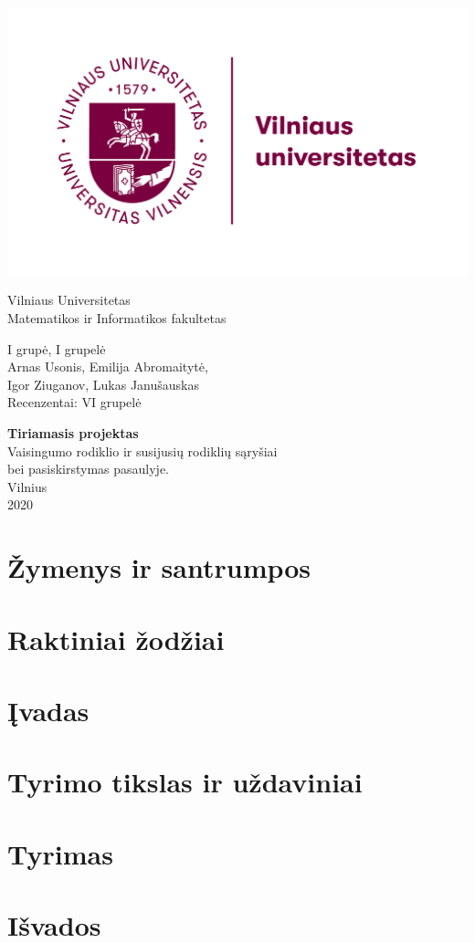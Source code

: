 \documentclass{article}
\begin{document}
\begin{titlepage}
    \centering
    \includegraphics[width=.5\textwidth]{pic/vu_logo.png} \\
    {\Huge
    Vilniaus Universitetas \\
    Matematikos ir Informatikos fakultetas\par} 
    \vspace{2cm}
    
    \Large
    {I grupė, I grupelė \\
    Arnas Usonis, Emilija Abromaitytė, \\ Igor Ziuganov, Lukas Janušauskas \\
    Recenzentai: VI grupelė\par}
    \vspace{1cm}
    {\LARGE
    \textbf{Tiriamasis projektas \\}}
    \vspace{0.2cm}
    {\Large
    Vaisingumo rodiklio ir susijusių rodiklių sąryšiai \\ bei pasiskirstymas pasaulyje. \\}
    \vspace*{\fill}
    Vilnius \\ 2020
    
    
\end{titlepage}
\pagebreak

\normalsize
\tableofcontents
\pagebreak

\section{Žymenys ir santrumpos}


\section{Raktiniai žodžiai}


\section{Įvadas}


\section{Tyrimo tikslas ir uždaviniai}


\section{Tyrimas}


\section{Išvados}

\end{document}
